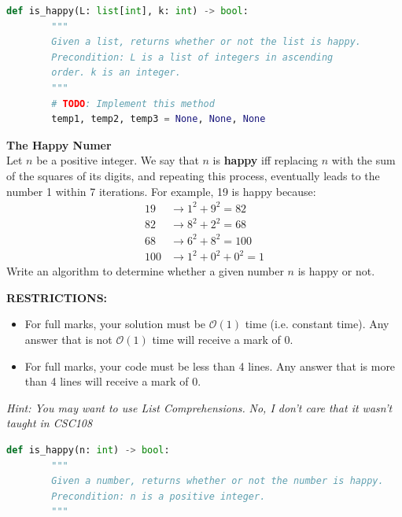 \documentclass[letterpaper,13pt,addpoints]{exam}
\begin{document}
\begin{questions}
    \begin{lstlisting}[language=Python, style=mystyle]
    def is_happy(L: list[int], k: int) -> bool:
        """
        Given a list, returns whether or not the list is happy.
        Precondition: L is a list of integers in ascending 
        order. k is an integer.
        """
        # TODO: Implement this method
        temp1, temp2, temp3 = None, None, None
    \end{lstlisting}

    \clearpage
    \question[10] \textbf{The Happy Numer} \\
    Let $n$ be a positive integer. We say that $n$ is \textbf{happy} iff replacing $n$ with the sum of the squares of its digits, and repeating this process, eventually leads to the number 1 within 7 iterations. For example, 19 is happy because:
    \begin{align*}
        19  & \rightarrow 1^2 + 9^2 = 82      \\
        82  & \rightarrow 8^2 + 2^2 = 68      \\
        68  & \rightarrow 6^2 + 8^2 = 100     \\
        100 & \rightarrow 1^2 + 0^2 + 0^2 = 1
    \end{align*}
    Write an algorithm to determine whether a given number $n$ is happy or not.

    \begin{center}
        \textbf{RESTRICTIONS:}
        \begin{itemize}
            \item For full marks, your solution must be $\mathcal{O}(1)$ time (i.e. constant
                  time). Any answer that is not $\mathcal{O}(1)$ time will receive a mark of 0.
            \item For full marks, your code must be less than 4 lines. Any answer that is more
                  than 4 lines will receive a mark of 0.
        \end{itemize}
        \textit{Hint: You may want to use List Comprehensions.}
        \textit{No, I don't care that it wasn't taught in CSC108}
    \end{center}
    \begin{lstlisting}[language=Python, style=mystyle]
    def is_happy(n: int) -> bool:
        """
        Given a number, returns whether or not the number is happy.
        Precondition: n is a positive integer.
        """
    \end{lstlisting}


\end{questions}
\end{document}
